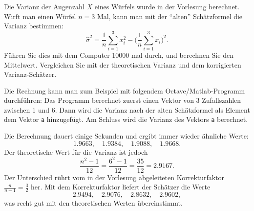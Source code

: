 Die Varianz der Augenzahl $X$ eines Würfels wurde in der Vorlesung
berechnet. Wirft man einen Würfel $n=3$ Mal, kann man mit der
``alten'' Schätzformel die Varianz bestimmen:
\[
\hat\sigma^2=\frac1n\sum_{i=1}^3x_i^2-\biggl(\frac1n\sum_{i=1}^3x_i\biggr)^2.
\]
Führen Sie dies mit dem Computer 10000 mal durch, und berechnen Sie den
Mittelwert. Vergleichen Sie mit der theoretischen Varianz und dem
korrigierten Varianz-Schätzer.


\begin{loesung}
Die Rechnung kann man zum Beispiel mit folgendem Octave/Matlab-Programm
durchführen:
Das Programm berechnet zuerst einen Vektor von 3 Zufallszahlen zwischen 1
und 6. Dann wird die Varianz nach der alten Schätzformel als Element
dem Vektor {\tt a} hinzugefügt. Am Schluss wird die Varianz des Vektors
{\tt a} berechnet.

Die Berechnung dauert einige Sekunden und ergibt immer wieder
ähnliche Werte:
\[
1.9663,\quad 
1.9384,\quad
1.9088,\quad
1.9668.
\]
Der theoretische Wert für die Varianz ist jedoch
\[
\frac{n^2-1}{12}=\frac{6^2-1}{12}=\frac{35}{12}=2.9167.
\]
Der Unterschied rührt vom in der Vorlesung abgeleiteten Korrekturfaktor
$\frac{n}{n-1}=\frac32$ her. Mit dem Korrekturfaktor liefert der Schätzer die
Werte
\[
2.9494,\quad 
2.9076,\quad
2.8632,\quad
2.9602,
\]
was recht gut mit den theoretischen Werten übereinstimmt.
\end{loesung}

